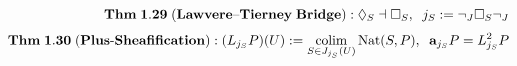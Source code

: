 \documentclass[preview]{standalone}
\begin{document}
\begin{align*}
\special{dvisvgm:raw <g id='unique000'>}\mathbf{Thm\;1.29\;(Lawvere\text{--}Tierney\;Bridge):}\;\Diamond_S \dashv \Box_S,\;\; j_S := \neg_J \Box_S \neg_J\\[3pt]\mathbf{Thm\;1.30\;(Plus\text{-}Sheafification):}\;(L_{j_S} P)(U) := \operatorname*{colim}_{S\in J_{j_S}(U)} \operatorname{Nat}(S, P),\;\; \mathbf{a}_{j_S} P = L_{j_S}^2 P\special{dvisvgm:raw </g>}
\end{align*}
\end{document}

